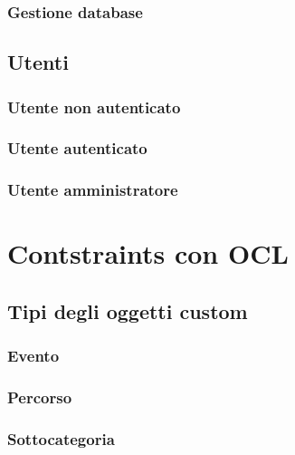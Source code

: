 \documentclass{article}
\begin{document}
\subsubsection{Gestione database}

\clearpage

\subsection{Utenti}

\subsubsection{Utente non autenticato}

\subsubsection{Utente autenticato}

\subsubsection{Utente amministratore}

\clearpage

\section{Contstraints con OCL}

\subsection{Tipi degli oggetti custom}

\subsubsection{Evento}

\subsubsection{Percorso}

\subsubsection{Sottocategoria}
\end{document}
